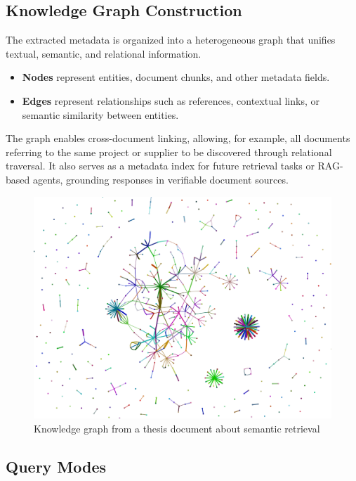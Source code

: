 \subsection{Knowledge Graph Construction}
The extracted metadata is organized into a heterogeneous graph that unifies textual, semantic, and relational information.

\begin{itemize}
    \item \textbf{Nodes} represent entities, document chunks, and other metadata fields.
    \item \textbf{Edges} represent relationships such as references, contextual links, or semantic similarity between entities.
\end{itemize}

The graph enables cross-document linking, allowing, for example, all documents referring to the same project or supplier to be discovered through relational traversal.  
It also serves as a metadata index for future retrieval tasks or RAG-based agents, grounding responses in verifiable document sources.

\begin{figure}[H]
    \centering
    \includegraphics[width=0.5\linewidth]{Images/graph_visualisation_big.png}
    \caption{Knowledge graph from a thesis document about semantic retrieval}\label{fig:knowledge-graph}
\end{figure}

\subsection{Query Modes}

